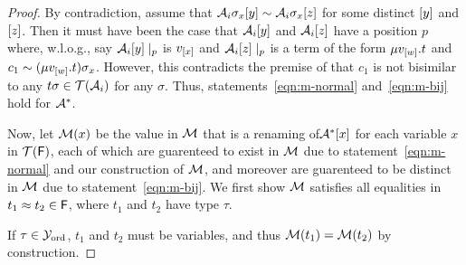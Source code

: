 \begin{proof}
By contradiction, assume that $\mathcal{A}_i \sigma_x [ y ] \sim \mathcal{A}_i \sigma_x [ z ]$ for some distinct $[ y ]$ and $[ z ]$.
Then it must have been the case that $\mathcal{A}_i [ y ]$ and $\mathcal{A}_i [ z ]$ have a position $p$
where, w.l.o.g., say $\mathcal{A}_i [ y ] \mid_p$ is $v_{[ x ]}$ and $\mathcal{A}_i [ z ] \mid_p$ is a term of the form $\mu v_{[ w ]}. t$ 
and $c_1 \sim (\mu v_{[ w ]}. t) \sigma_x$.
However, this contradicts the premise of  that $c_1$ is not bisimilar to any $t \sigma \in \mathcal{T}( \mathcal{A}_i )$ for any $\sigma$.
Thus, statements~\ref{eqn:m-normal} and~\ref{eqn:m-bij} hold for $\mathcal{A}^\ast$.


Now, let $\mathcal{M}( x )$ be the value in $\mathcal{M}$ that is a renaming of$\mathcal{A}^\ast [ x ]$ for each variable $x$ in $\mathcal{T}(\mathsf{F})$,
each of which are guarenteed to exist in $\mathcal{M}$ due to statement~\ref{eqn:m-normal} and our construction of $\mathcal{M}$,
and moreover are guarenteed to be distinct in $\mathcal{M}$ due to statement~\ref{eqn:m-bij}.
We first show $\mathcal{M}$ satisfies all equalities in $t_1 \approx t_2 \in \mathsf{F}$, where $t_1$ and $t_2$ have type $\tau$.

If $\tau \in \mathcal{Y}_{\mathrm{ord}}$, $t_1$ and $t_2$ must be variables, and thus $\mathcal{M}( t_1 ) = \mathcal{M}( t_2 )$ by construction.


\end{proof}
